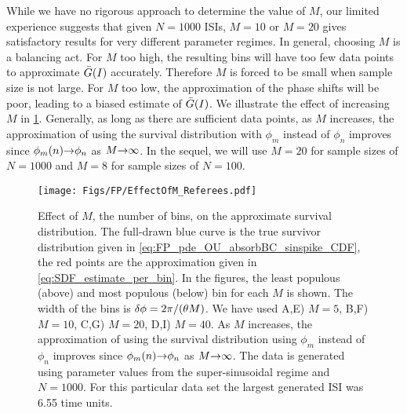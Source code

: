 While we have no rigorous approach to determine the value of $M$, our limited
experience suggests that given $N=1000$ ISIs, $M=10$ or $M=20$ gives satisfactory
results for very different parameter regimes. In general, choosing $M$ is a
balancing act. For $M$ too high, the resulting bins will have too few data
points to approximate ${ \bar{G} }(I)$ accurately. Therefore $M$ is forced to be small
when sample size is not large. For $M$ too low, the approximation of the phase
shifts will be poor, leading to a biased estimate of ${ \bar{G} }(I)$. We illustrate the
effect of increasing $M$ in \cref{fig:effect_of_M}. Generally, as long as there
are sufficient data points, as $M$ increases, the approximation of using the
survival distribution with $\phi_m$ instead of $\phi_n$ improves since
$\phi_m(n) {\rightarrow} \phi_n$ as $M {\rightarrow} \infty$. In the sequel, we will use $M=20$ for
sample sizes of $N=1000$ and $M=8$ for sample sizes of $N=100$.

\begin{figure}[h]
\begin{center}
\texttt{[image: Figs/FP/EffectOfM\_Referees.pdf]}
\caption[Effect of Bin-size]{Effect of $M$, the number of bins, on the
approximate survival distribution. The full-drawn blue curve is the true survivor distribution
given in \cref{eq:FP_pde_OU_absorbBC_sinspike_CDF}, the red points are the approximation
given in \cref{eq:SDF_estimate_per_bin}.  
In the figures, the least populous (above) and most populous (below) bin for
each $M$ is shown. The width of the bins is ${ \delta \phi } = {2\pi}/{({ \theta} M)}$.
We have used A,E) $M=5$, B,F) $M=10$, C,G) $M=20$,
D,I) $M=40$. As $M$ increases, the approximation of using the survival
distribution using $\phi_m$ instead of $\phi_n$ improves since $\phi_m(n) {\rightarrow}
\phi_n$ as $M {\rightarrow} \infty$. The data is generated using parameter
values from the super-sinusoidal regime and $N=1000$. For this
particular data set the largest generated ISI was 6.55 time units.}
\label{fig:effect_of_M}
\end{center}
\end{figure}

